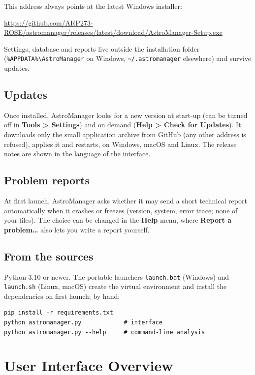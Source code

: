 \documentclass[11pt,a4paper]{article}
\newcommand{\menu}[1]{\textsf{\textbf{\textcolor{sky}{#1}}}}
\begin{document}
This address always points at the latest Windows installer:
\begin{center}\footnotesize\url{https://github.com/ARP273-ROSE/astromanager/releases/latest/download/AstroManager-Setup.exe}\end{center}

Settings, database and reports live outside the installation folder
(\texttt{\%APPDATA\%\textbackslash AstroManager} on Windows,
\texttt{\textasciitilde/.astromanager} elsewhere) and survive updates.

\subsection{Updates}

Once installed, AstroManager looks for a new version at start-up (can be turned
off in \menu{Tools > Settings}) and on demand (\menu{Help > Check for Updates}).
It downloads only the small application archive from GitHub (any other address
is refused), applies it and restarts, on Windows, macOS and Linux. The release
notes are shown in the language of the interface.

\subsection{Problem reports}

At first launch, AstroManager asks whether it may send a short technical report
automatically when it crashes or freezes (version, system, error trace; none of
your files). The choice can be changed in the \menu{Help} menu, where
\menu{Report a problem\dots} also lets you write a report yourself.

\subsection{From the sources}

Python 3.10 or newer. The portable launchers \texttt{launch.bat} (Windows) and
\texttt{launch.sh} (Linux, macOS) create the virtual environment and install the
dependencies on first launch; by hand:

\begin{lstlisting}
pip install -r requirements.txt
python astromanager.py            # interface
python astromanager.py --help     # command-line analysis
\end{lstlisting}

\section{User Interface Overview}
\label{sec:ui}
\end{document}
